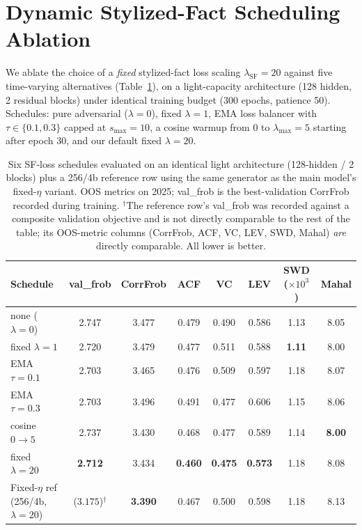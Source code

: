 \section{Dynamic Stylized-Fact Scheduling Ablation}
\label{app:dynamic_sf}

We ablate the choice of a \emph{fixed} stylized-fact loss scaling $\lambda_\text{SF}=20$ against five time-varying alternatives (Table~\ref{tab:dynamic_sf}), on a light-capacity architecture (128 hidden, 2 residual blocks) under identical training budget (300 epochs, patience 50). Schedules: pure adversarial ($\lambda=0$), fixed $\lambda=1$, EMA loss balancer with $\tau \in \{0.1, 0.3\}$ capped at $s_\text{max}=10$, a cosine warmup from $0$ to $\lambda_\text{max}=5$ starting after epoch 30, and our default fixed $\lambda=20$.

\begin{table}[h]
\centering
\caption{Six SF-loss schedules evaluated on an identical light architecture (128-hidden / 2 blocks) plus a 256/4b reference row using the same generator as the main model's fixed-$\eta$ variant. OOS metrics on 2025; val\_frob is the best-validation CorrFrob recorded during training. $^\dagger$The reference row's val\_frob was recorded against a composite validation objective and is not directly comparable to the rest of the table; its OOS-metric columns (CorrFrob, ACF, VC, LEV, SWD, Mahal) \emph{are} directly comparable. All lower is better.}
\label{tab:dynamic_sf}
\small
\begin{tabular}{lccccccc}
\toprule
Schedule & val\_frob & CorrFrob & ACF & VC & LEV & SWD ($\times10^3$) & Mahal \\
\midrule
none ($\lambda=0$)   & 2.747 & 3.477 & 0.479 & 0.490 & 0.586 & 1.13 & 8.05 \\
fixed $\lambda=1$    & 2.720 & 3.479 & 0.477 & 0.511 & 0.588 & \textbf{1.11} & 8.00 \\
EMA $\tau=0.1$       & 2.703 & 3.465 & 0.476 & 0.509 & 0.597 & 1.18 & 8.07 \\
EMA $\tau=0.3$       & 2.703 & 3.496 & 0.491 & 0.477 & 0.606 & 1.15 & 8.06 \\
cosine $0 \to 5$     & 2.737 & 3.430 & 0.468 & 0.477 & 0.589 & 1.14 & \textbf{8.00} \\
fixed $\lambda=20$   & \textbf{2.712} & 3.434 & \textbf{0.460} & \textbf{0.475} & \textbf{0.573} & 1.18 & 8.08 \\
\midrule
Fixed-$\eta$ ref (256/4b, $\lambda=20$) & ($3.175$)$^\dagger$ & \textbf{3.390} & 0.467 & 0.500 & 0.598 & 1.18 & 8.13 \\
\bottomrule
\end{tabular}
\end{table}

